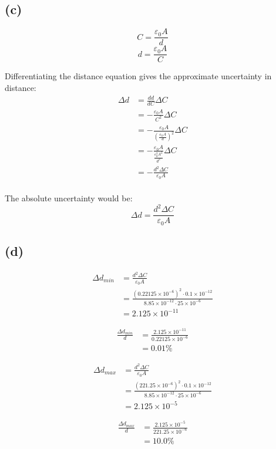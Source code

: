 \documentclass[11pt]{article}
\begin{document}
\subsection{(c)}
\label{sec:orgc462299}
\[C = \frac{\varepsilon_0 A}{d}\]
\[d = \frac{\varepsilon_0 A}{C}\]

Differentiating the distance equation gives the approximate uncertainty in distance:
\begin{align*}
\Delta d &= \frac{dd}{dC} \Delta C \\
&= -\frac{\varepsilon_0 A}{C^2} \Delta C \\
&= -\frac{\varepsilon_0 A}{\left(\frac{\varepsilon_0 A}{d} \right)^2} \Delta C \\
&= -\frac{\varepsilon_0 A}{\frac{\varepsilon_0^2 A^2}{d^2}} \Delta C \\
&= -\frac{d^2 \Delta C}{\varepsilon_0 A} \\
\end{align*}

The absolute uncertainty would be:
\[\Delta d = \frac{d^2 \Delta C}{\varepsilon_0 A}\]
\subsection{(d)}
\label{sec:orgc266cf4}
\begin{align*}
\Delta d_{min} &= \frac{d^2 \Delta C}{\varepsilon_0 A} \\
&= \frac{(0.22125 \times 10^{-6})^2 \cdot 0.1 \times 10^{-12}}{8.85 \times 10^{-12} \cdot 25 \times 10^{-6}} \\
&= 2.125 \times 10^{-11}
\end{align*}

\begin{align*}
\frac{\Delta d_{min}}{d} &= \frac{2.125 \times 10^{-11}}{0.22125 \times 10^{-6}} \\
&= 0.01\%
\end{align*}

\begin{align*}
\Delta d_{max} &= \frac{d^2 \Delta C}{\varepsilon_0 A} \\
&= \frac{(221.25 \times 10^{-6})^2 \cdot 0.1 \times 10^{-12}}{8.85 \times 10^{-12} \cdot 25 \times 10^{-6}} \\
&= 2.125 \times 10^{-5}
\end{align*}

\begin{align*}
\frac{\Delta d_{max}}{d} &= \frac{2.125 \times 10^{-5}}{221.25 \times 10^{-6}} \\
&= 10.0\%
\end{align*}
\end{document}
